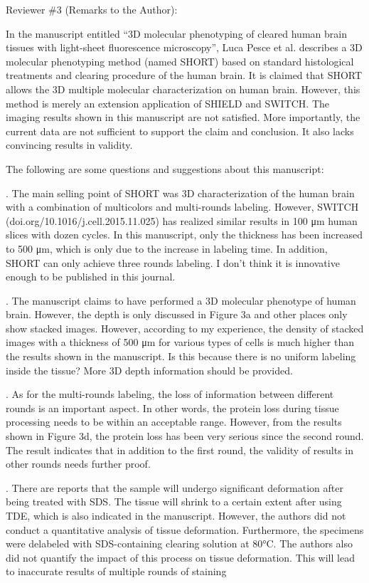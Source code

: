 \documentclass{article}
\begin{document}
\noindent {}Reviewer \#3 (Remarks to the Author):

\noindent In the manuscript entitled “3D molecular phenotyping of cleared human brain tissues with light-sheet fluorescence microscopy”, Luca Pesce et al. describes a 3D molecular phenotyping method (named SHORT) based on standard histological treatments and clearing procedure of the human brain. It is claimed that SHORT allows the 3D multiple molecular characterization on human brain. However, this method is merely an extension application of SHIELD and SWITCH. The imaging results shown in this manuscript are not satisfied. More importantly, the current data are not sufficient to support the claim and conclusion. It also lacks convincing results in validity.

\noindent The following are some questions and suggestions about this manuscript:

. The main selling point of SHORT was 3D characterization of the human brain with a combination of multicolors and multi-rounds labeling. However, SWITCH (doi.org/10.1016/j.cell.2015.11.025) has realized similar results in 100 μm human slices with dozen cycles. In this manuscript, only the thickness has been increased to 500 μm, which is only due to the increase in labeling time. In addition, SHORT can only achieve three rounds labeling. I don’t think it is innovative enough to be published in this journal.

. The manuscript claims to have performed a 3D molecular phenotype of human brain. However, the depth is only discussed in Figure 3a and other places only show stacked images. However, according to my experience, the density of stacked images with a thickness of 500 μm for various types of cells is much higher than the results shown in the manuscript. Is this because there is no uniform labeling inside the tissue? More 3D depth information should be provided.

. As for the multi-rounds labeling, the loss of information between different rounds is an important aspect. In other words, the protein loss during tissue processing needs to be within an acceptable range. However, from the results shown in Figure 3d, the protein loss has been very serious since the second round. The result indicates that in addition to the first round, the validity of results in other rounds needs further proof.

. There are reports that the sample will undergo significant deformation after being treated with SDS. The tissue will shrink to a certain extent after using TDE, which is also indicated in the manuscript. However, the authors did not conduct a quantitative analysis of tissue deformation. Furthermore, the specimens were delabeled with SDS-containing clearing solution at 80°C. The authors also did not quantify the impact of this process on tissue deformation. This will lead to inaccurate results of multiple rounds of staining
\end{document}
